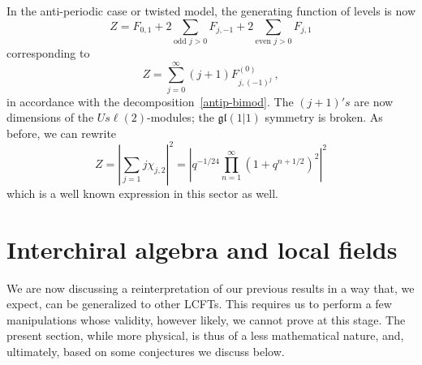 \documentclass[11pt]{article}
\newcommand{\gl}{\mathfrak{gl}}
\theoremstyle{definition}
\begin{document}
In the anti-periodic case or twisted model,
 the generating function of levels is now
\begin{equation}
Z=F_{0,1}+2\sum_{\text{odd } j>0} F_{j,-1}+2\sum_{\text{even }j>0} F_{j,1}
\end{equation}
%
corresponding to
%
   \begin{equation}
   Z= \sum_{j=0}^\infty (j+1)  F_{j,(-1)^j}^{(0)}\,,
    \end{equation}
in accordance with the decomposition~\eqref{antip-bimod}.  The
$(j+1)'s$ are now dimensions of the $U s\ell(2)$-modules; the
$\gl(1|1)$ symmetry is broken. As before, we can rewrite
%
   \begin{equation}
   Z=\left|\sum_{j=1}j\chi_{j,2}\right|^2=
\left|q^{-1/24}\prod_{n=1}^\infty \left(1+q^{n+1/2}\right)^2\right|^2
    \end{equation}
which is a well known expression in this sector as well.






 \section{Interchiral algebra and local fields}\label{sec:interchiral}

We are now discussing a reinterpretation of our previous results in a way that, we expect, can be generalized to other LCFTs. This requires us to perform a few manipulations whose validity, however likely, we cannot prove at this stage. The present section, while more physical,  is thus of a less mathematical nature, and, ultimately, based on some conjectures we discuss below.
\end{document}
